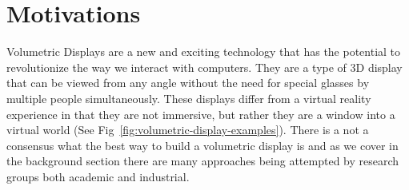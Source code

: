 \section{Motivations}

Volumetric Displays are a new and exciting technology that has the potential to revolutionize the way we interact with computers. They are a type of 3D display that can be viewed from any angle without the need for special glasses by multiple people simultaneously. \tocite These displays differ from a virtual reality experience in that they are not immersive, but rather they are a window into a virtual world (See Fig~\ref{fig:volumetric-display-examples}). There is a not a consensus what the best way to build a volumetric display is and as we cover in the background section there are many approaches being attempted by research groups both academic and industrial.

